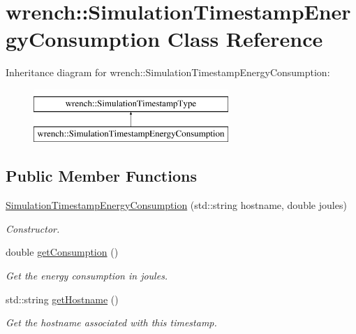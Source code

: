 \hypertarget{classwrench_1_1_simulation_timestamp_energy_consumption}{}\section{wrench\+:\+:Simulation\+Timestamp\+Energy\+Consumption Class Reference}
\label{classwrench_1_1_simulation_timestamp_energy_consumption}
Inheritance diagram for wrench\+:\+:Simulation\+Timestamp\+Energy\+Consumption\+:\begin{figure}[H]
\begin{center}
\leavevmode
\includegraphics[height=2.000000cm]{classwrench_1_1_simulation_timestamp_energy_consumption}
\end{center}
\end{figure}
\subsection*{Public Member Functions}
\begin{DoxyCompactItemize}
\item 
\hyperlink{classwrench_1_1_simulation_timestamp_energy_consumption_a2e5b737ec647470f6332f0415c5223e8}{Simulation\+Timestamp\+Energy\+Consumption} (std\+::string hostname, double joules)
\begin{DoxyCompactList}\small\item\em Constructor. \end{DoxyCompactList}\item 
double \hyperlink{classwrench_1_1_simulation_timestamp_energy_consumption_a454ab3147bfd09aa4c5f90a631e75569}{get\+Consumption} ()
\begin{DoxyCompactList}\small\item\em Get the energy consumption in joules. \end{DoxyCompactList}\item 
std\+::string \hyperlink{classwrench_1_1_simulation_timestamp_energy_consumption_a605050f7adac67374dc7c0dbf419220c}{get\+Hostname} ()
\begin{DoxyCompactList}\small\item\em Get the hostname associated with this timestamp. \end{DoxyCompactList}\end{DoxyCompactItemize}


